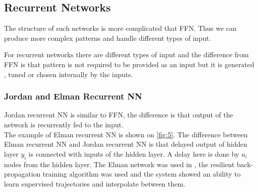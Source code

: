\documentclass[12pt,a4paper]{report}
\begin{document}
			\subsection{Recurrent Networks}
				The structure of such networks is more complicated that FFN. Thus we can produce more complex patterns and handle different types of input.
				
				For recurrent networks there are different types of input and the difference from FFN is that pattern is not required to be provided as an input but it is generated , tuned or chosen internally by the inputs. 
				
				\subsubsection{Jordan and Elman Recurrent NN}
					Jordan recurrent NN is similar to FFN, the difference is that output of the network is recurrently fed to the input.\\
					The example of Elman recurrent NN is shown on \ref{fig:5}. The difference between Elman recurrent NN and Jordan recurrent NN is that delayed output of hidden layer $y_i$ is connected with inputs of the hidden layer. A delay here is done by $u_i$ nodes from the hidden layer. The Elman network was used in \cite{berns1995neural}, the resilient back-propagation training algorithm was used and the system showed an ability to learn supervised trajectories and interpolate between them.
					
\end{document}
